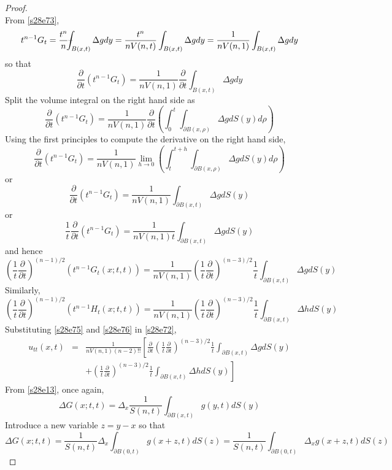 \documentclass{article}
\newcommand{\fint}{\mbox{--}\mkern-16mu\int}
\theoremstyle{plain}
\numberwithin{thm}{section}
\theoremstyle{plain}
\numberwithin{prop}{section}
\theoremstyle{definition}
\numberwithin{defn}{section}
\theoremstyle{remark}
\numberwithin{equation}{section}
\begin{document}
\begin{proof}
\begin{equation}
\end{equation}
From \eqref{s28e73},
\[
t^{n-1}G_t = \frac{t^n}{n}\fint_{B(x,t)} \Delta g dy = \frac{t^n}{nV(n,t)}\int_{B(x,t)}\Delta g dy =
\frac{1}{nV(n,1)}\int_{B(x,t)}\Delta g dy
\]
so that
\[
\frac{\partial}{\partial t}(t^{n-1}G_t) = \frac{1}{nV(n,1)}\frac{\partial}{\partial t}\int_{B(x,t)}\Delta g dy
\]
Split the volume integral on the right hand side as
\[
\frac{\partial}{\partial t}(t^{n-1}G_t) = \frac{1}{nV(n,1)}\frac{\partial}{\partial t}
\left(\int_0^t\int_{\partial B(x,\rho)} \Delta g dS(y)d\rho\right)
\]
Using the first principles to compute the derivative on the right hand side,
\[
\frac{\partial}{\partial t}(t^{n-1}G_t) = \frac{1}{nV(n,1)}\lim_{h\rightarrow 0}
\left(\int_t^{t+h}\int_{\partial B(x,\rho)} \Delta g dS(y)d\rho\right)
\]
or
\[
\frac{\partial}{\partial t}(t^{n-1}G_t) = \frac{1}{nV(n,1)}\int_{\partial B(x,t)} \Delta g dS(y)
\]
or
\[
\frac{1}{t}\frac{\partial}{\partial t}(t^{n-1}G_t) = \frac{1}{nV(n,1)t}\int_{\partial B(x,t)} \Delta g dS(y)
\]
and hence
\begin{equation}\label{s28e75}
\left(\frac{1}{t}\frac{\partial}{\partial t}\right)^{(n-1)/2}(t^{n-1}G_t(x; t,t)) = 
\frac{1}{nV(n,1)}\left(\frac{1}{t}\frac{\partial}{\partial t}\right)^{(n-3)/2}
\frac{1}{t}\int_{\partial B(x,t)} \Delta g dS(y)
\end{equation}
Similarly,
\begin{equation}\label{s28e76}
\left(\frac{1}{t}\frac{\partial}{\partial t}\right)^{(n-1)/2}(t^{n-1}H_t(x; t,t)) = 
\frac{1}{nV(n,1)}\left(\frac{1}{t}\frac{\partial}{\partial t}\right)^{(n-3)/2}
\frac{1}{t}\int_{\partial B(x,t)} \Delta h dS(y)
\end{equation}
Substituting \eqref{s28e75} and \eqref{s28e76} in \eqref{s28e72},
\begin{eqnarray}
u_{tt}(x,t) &=& \frac{1}{nV(n,1)(n-2)!!}\left[\frac{\partial}{\partial t}
\left(\frac{1}{t}\frac{\partial}{\partial t}\right)^{(n-3)/2}\frac{1}{t}\int_{\partial B(x,t)} \Delta g dS(y) 
\right. \nonumber \\
& & + \left.
\left(\frac{1}{t}\frac{\partial}{\partial t}\right)^{(n-3)/2}\frac{1}{t}\int_{\partial B(x,t)}\Delta hdS(y)\right]
\label{s28e77}
\end{eqnarray}
From \eqref{s28e13}, once again,
\[
\Delta G(x; t,t) = \Delta_x \frac{1}{S(n,t)}\int_{\partial B(x,t)}g(y,t)dS(y) 
\]
Introduce a new variable $z = y - x$ so that
\[
\Delta G(x;t,t) = \frac{1}{S(n,t)}\Delta_x\int_{\partial B(0,t)} g(x + z, t)dS(z) = 
\frac{1}{S(n,t)}\int_{\partial B(0,t)} \Delta_x g(x + z, t)dS(z) 
\]
\end{proof}
\end{document}
